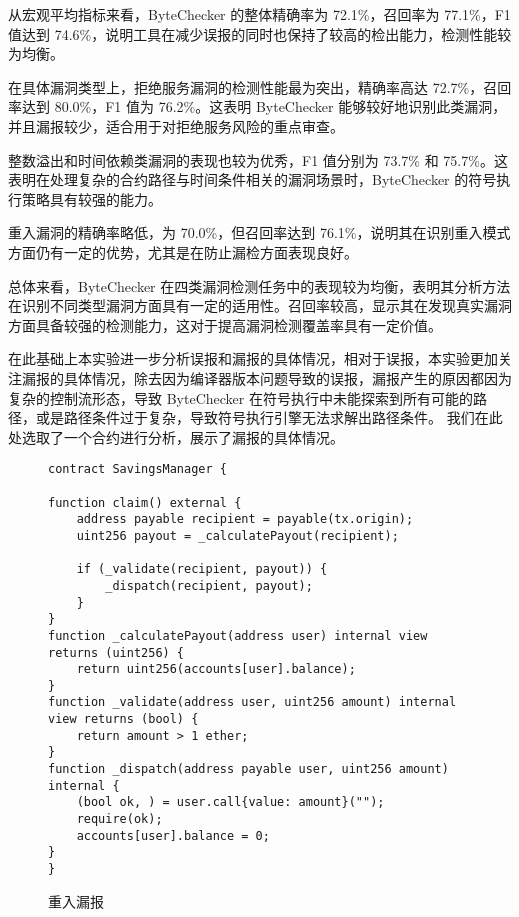 \documentclass[print, master, vlined, timesmath]{DissertUESTC}
\begin{document}
从宏观平均指标来看，ByteChecker 的整体精确率为 72.1\%，召回率为 77.1\%，F1 值达到 74.6\%，说明工具在减少误报的同时也保持了较高的检出能力，检测性能较为均衡。

在具体漏洞类型上，拒绝服务漏洞的检测性能最为突出，精确率高达 72.7\%，召回率达到 80.0\%，F1 值为 76.2\%。这表明 ByteChecker 能够较好地识别此类漏洞，并且漏报较少，适合用于对拒绝服务风险的重点审查。

整数溢出和时间依赖类漏洞的表现也较为优秀，F1 值分别为 73.7\% 和 75.7\%。这表明在处理复杂的合约路径与时间条件相关的漏洞场景时，ByteChecker 的符号执行策略具有较强的能力。

重入漏洞的精确率略低，为 70.0\%，但召回率达到 76.1\%，说明其在识别重入模式方面仍有一定的优势，尤其是在防止漏检方面表现良好。

总体来看，ByteChecker 在四类漏洞检测任务中的表现较为均衡，表明其分析方法在识别不同类型漏洞方面具有一定的适用性。召回率较高，显示其在发现真实漏洞方面具备较强的检测能力，这对于提高漏洞检测覆盖率具有一定价值。

在此基础上本实验进一步分析误报和漏报的具体情况，相对于误报，本实验更加关注漏报的具体情况，除去因为编译器版本问题导致的误报，漏报产生的原因都因为复杂的控制流形态，导致 ByteChecker 在符号执行中未能探索到所有可能的路径，或是路径条件过于复杂，导致符号执行引擎无法求解出路径条件。 我们在此处选取了一个合约进行分析，展示了漏报的具体情况。

\begin{figure}[H]
    \centering
    \begin{minipage}{0.9\textwidth}
    \begin{verbatim}
contract SavingsManager {

function claim() external {
    address payable recipient = payable(tx.origin);
    uint256 payout = _calculatePayout(recipient);

    if (_validate(recipient, payout)) {
        _dispatch(recipient, payout);
    }
}
function _calculatePayout(address user) internal view returns (uint256) {
    return uint256(accounts[user].balance);
}
function _validate(address user, uint256 amount) internal view returns (bool) {
    return amount > 1 ether; 
}
function _dispatch(address payable user, uint256 amount) internal {
    (bool ok, ) = user.call{value: amount}("");
    require(ok);
    accounts[user].balance = 0;
}
}
    \end{verbatim}
    \end{minipage}
    \caption{重入漏报}
\end{figure}
\end{document}
